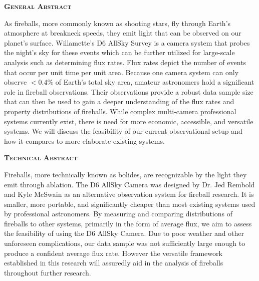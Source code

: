 \begin{flushleft}

\textbf{\textsc{\LARGE General Abstract}}

\vspace{0.2 in}

As fireballs, more commonly known as shooting stars, fly through Earth’s atmosphere at breakneck speeds, they emit light that can be observed on our planet’s surface. 
Willamette’s D6 AllSky Survey is a camera system that probes the night’s sky for these events which can be further utilized for large-scale analysis such as determining flux rates.
Flux rates depict the number of events that occur per unit time per unit area.
Because one camera system can only observe $<0.4\%$ of Earth’s total sky area, amateur astronomers hold a significant role in fireball observations.
Their observations provide a robust data sample size that can then be used to gain a deeper understanding of the flux rates and property distributions of fireballs.
While complex multi-camera professional systems currently exist, there is need for more economic, accessible, and versatile systems. 
We will discuss the feasibility of our current observational setup and how it compares to more elaborate existing systems.
\vspace{0.25 in}

\textbf{\textsc{\LARGE Technical Abstract}}

\vspace{0.2 in}

Fireballs, more technically known as bolides, are recognizable by the light they emit through ablation. 
The D6 AllSky Camera was designed by Dr. Jed Rembold and Kyle McSwain as an alternative observation system for fireball research. 
It is smaller, more portable, and significantly cheaper than most existing systems used by professional astronomers. 
By measuring and comparing distributions of fireballs to other systems, primarily in the form of average flux, we aim to assess the feasibility of using the D6 AllSky Camera.  
Due to poor weather and other unforeseen complications, our data sample was not sufficiently large enough to produce a confident average flux rate.
However the versatile framework established in this research will assuredly aid in the analysis of fireballs throughout further research.

\end{flushleft}